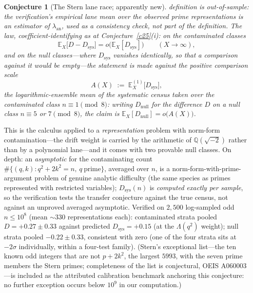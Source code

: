 \documentclass[11pt]{article}
\newtheorem{conjecture}{Conjecture}
\theoremstyle{definition}
\begin{document}
\begin{conjecture}[The Stern lane race; apparently new]
definition is out-of-sample: the verification's empirical lane mean
over the observed prime representations is an estimator of
$\lambda_{\mathrm{an}}$, used as a consistency check, not part of the
definition.  The law, coefficient-identifying as at
Conjecture~\ref{c25}(i): on the contaminated classes
\[
\mathbb E_X\bigl[D-D_{\mathrm{sys}}\bigr]
=o\bigl(\mathbb E_X[D_{\mathrm{sys}}]\bigr)
\qquad(X\to\infty),
\]
and on the null classes---where $D_{\mathrm{sys}}$ vanishes
identically, so that a comparison against it would be empty---the
statement is made against the positive comparison scale
\[
A(X)\;:=\;\mathbb E_X^{(1)}\bigl[D_{\mathrm{sys}}\bigr],
\]
the logarithmic-ensemble mean of the systematic census taken over the
\emph{contaminated} class $n\equiv1\pmod 8$: writing
$D_{\mathrm{null}}$ for the difference $D$ on a null class
$n\equiv5$ or $7\pmod 8$, the claim is
$\mathbb E_X[D_{\mathrm{null}}]=o\bigl(A(X)\bigr)$.
\end{conjecture}

This is the calculus applied to a \emph{representation} problem with
norm-form contamination---the drift weight is carried by the
arithmetic of $\mathbb Q(\sqrt{-2})$ rather than by a polynomial
lane---and it comes with two provable null classes.  On depth: an
\emph{asymptotic} for the
contaminating count $\#\{(q,k):q^2+2k^2=n,\ q\ \text{prime}\}$,
averaged over $n$, is a norm-form-with-prime-argument problem of
genuine analytic difficulty (the same species as primes represented
with restricted variables);
$D_{\mathrm{sys}}(n)$ is \emph{computed exactly per sample}, so the
verification tests the transfer conjecture against the true census,
not against an unproved averaged asymptotic.  Verified on $2{,}500$
log-sampled odd $n\le10^8$ (mean ${\sim}330$ representations each):
contaminated strata pooled $D=+0.27\pm0.33$ against predicted
$D_{\mathrm{sys}}=+0.15$ (at the $\Lambda(q^2)$ weight);
null strata pooled $-0.22\pm0.33$,
consistent with zero (one of the four strata sits at $-2\sigma$
individually, within a four-test family).  (Stern's exceptional list---the ten known odd integers that are not $p+2k^2$, the largest
$5993$, with the seven prime members the Stern primes; completeness
of the list is conjectural, OEIS A060003---is
included as the attributed calibration benchmark anchoring this conjecture:
no further exception occurs below $10^9$ in our computation.)
\end{document}
